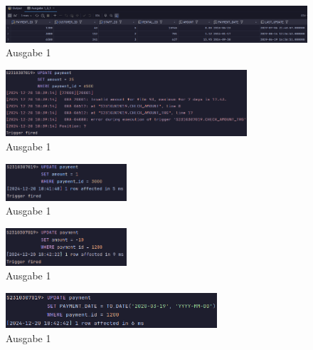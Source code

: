 \documentclass[12pt]{scrartcl}
\begin{document}
\pagebreak

\begin{figure}[H]
	\centering
	\includegraphics[width=1\textwidth]{../1_3_1.png}
	\caption{Ausgabe 1}
\end{figure}

\begin{figure}[H]
	\centering
	\includegraphics[width=0.8\textwidth]{../1_3_2.png}
	\caption{Ausgabe 1}
\end{figure}

\begin{figure}[H]
	\centering
	\includegraphics[width=0.4\textwidth]{../1_3_3.png}
	\caption{Ausgabe 1}
\end{figure}

\begin{figure}[H]
	\centering
	\includegraphics[width=0.4\textwidth]{../1_3_4.png}
	\caption{Ausgabe 1}
\end{figure}

\begin{figure}[H]
	\centering
	\includegraphics[width=0.7\textwidth]{../1_3_5.png}
	\caption{Ausgabe 1}
\end{figure}
\end{document}
